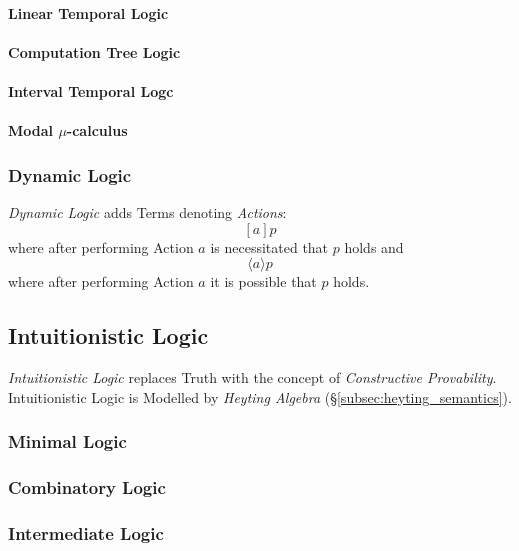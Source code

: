 \documentclass{article}
\begin{document}
\paragraph{Linear Temporal Logic}

\paragraph{Computation Tree Logic}

\paragraph{Interval Temporal Logc}

\paragraph{Modal $\mu$-calculus}

\subsubsection{Dynamic Logic}

\emph{Dynamic Logic} adds Terms denoting \emph{Actions}:
\[[a]p\]
where after performing Action $a$ is necessitated that $p$ holds and
\[\langle a \rangle p\]
where after performing Action $a$ it is possible that $p$ holds.

\subsection{Intuitionistic Logic}\label{subsec:intuitionistic_logic}

\emph{Intuitionistic Logic} replaces Truth with the concept of
\emph{Constructive Provability}. Intuitionistic Logic is Modelled by
\emph{Heyting Algebra} (\S\ref{subsec:heyting_semantics}).

\subsubsection{Minimal Logic}

\subsubsection{Combinatory Logic}\label{subsec:combinatory_logic}

\subsubsection{Intermediate Logic}
\end{document}
